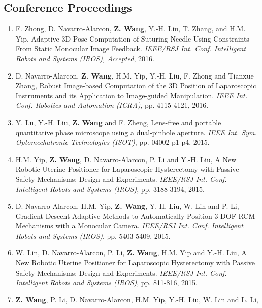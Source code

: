 \documentclass[10pt,letterpaper]{article}
\begin{document}
\subsection*{Conference Proceedings}
\begin{enumerate}
\item F. Zhong, D. Navarro-Alarcon, \textbf{Z. Wang}, Y.-H. Liu, T. Zhang, and H.M. Yip,
  Adaptive 3D Pose Computation of Suturing Needle Using Constraints From Static Monocular Image Feedback.
  \textit{{IEEE/RSJ} Int. Conf. Intelligent Robots and Systems (IROS), Accepted}, 2016.  
\item D. Navarro-Alarcon, \textbf{Z. Wang}, H.M. Yip, Y.-H. Liu, F. Zhong and Tianxue Zhang,
  Robust Image-based Computation of the 3D Position of Laparoscopic Instruments and its Application to Image-guided Manipulation.
  \textit{{IEEE} Int. Conf. Robotics and Automation (ICRA)}, pp. 4115-4121, 2016.
\item Y. Lu, Y.-H. Liu, \textbf{Z. Wang} and F. Zheng,
  Lens-free and portable quantitative phase microscope using a dual-pinhole aperture.
  \textit{{IEEE} Int. Sym. Optomechatronic Technologies (ISOT)}, pp. 04002 p1-p4, 2015.
\item H.M. Yip, \textbf{Z. Wang}, D. Navarro-Alarcon, P. Li and Y.-H. Liu,
  A New Robotic Uterine Positioner for Laparoscopic Hysterectomy with Passive Safety Mechanisms: Design and Experiments.
  \textit{{IEEE/RSJ} Int. Conf. Intelligent Robots and Systems (IROS)}, pp. 3188-3194, 2015.
\item D. Navarro-Alarcon, H.M. Yip, \textbf{Z. Wang}, Y.-H. Liu, W. Lin and P. Li,
  Gradient Descent Adaptive Methods to Automatically Position 3-DOF RCM Mechanisms with a Monocular Camera.
  \textit{{IEEE/RSJ} Int. Conf. Intelligent Robots and Systems (IROS)}, pp. 5403-5409, 2015.
\item W. Lin, D. Navarro-Alarcon, P. Li, \textbf{Z. Wang}, H.M. Yip and Y.-H. Liu,
  A New Robotic Uterine Positioner for Laparoscopic Hysterectomy with Passive Safety Mechanisms: Design and Experiments.
  \textit{{IEEE/RSJ} Int. Conf. Intelligent Robots and Systems (IROS)}, pp. 811-816, 2015.
\item \textbf{Z. Wang}, P. Li, D. Navarro-Alarcon, H.M. Yip, Y.-H. Liu, W. Lin and L. Li,

\end{enumerate}
\end{document}
